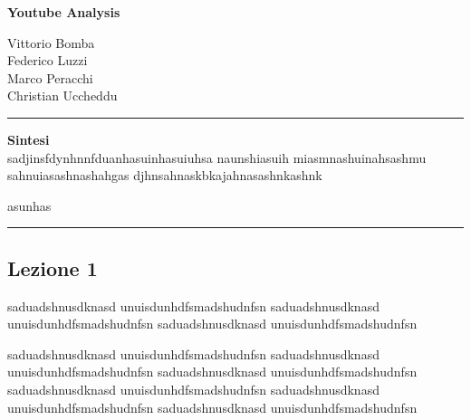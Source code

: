 \documentclass[10pt, a4paper,openany]{article}
\begin{document}
\begin{center}
\textbf{Youtube Analysis}
\end{center}

\begin{flushright}
Vittorio Bomba \\ Federico Luzzi \\  Marco Peracchi \\ Christian Uccheddu
\end{flushright}

\hrule
\vspace{0.5cm}

\centering\textbf{{Sintesi}}
\\
sadjinsfdynhnnfduanhasuinhasuiuhsa naunshiasuih miasmnashuinahsashmu sahnuiasashnashahgas djhnsahnaskbkajahnasashnkashnk

asunhas
\vspace{0.5cm}
\hrule

\begin{multicols}{2}
\section*{Lezione 1}

saduadshnusdknasd unuisdunhdfsmadshudnfsn
saduadshnusdknasd unuisdunhdfsmadshudnfsn
saduadshnusdknasd unuisdunhdfsmadshudnfsn

saduadshnusdknasd unuisdunhdfsmadshudnfsn
saduadshnusdknasd unuisdunhdfsmadshudnfsn
saduadshnusdknasd unuisdunhdfsmadshudnfsn
saduadshnusdknasd unuisdunhdfsmadshudnfsn
saduadshnusdknasd unuisdunhdfsmadshudnfsn
saduadshnusdknasd unuisdunhdfsmadshudnfsn



\end{multicols}
\end{document}
